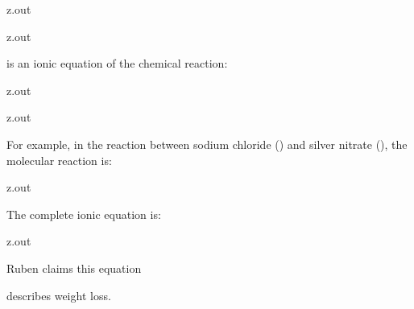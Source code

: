 \MyIO


\begin{VerbatimOut}{z.out}

\end{VerbatimOut}

\MyIO


\begin{VerbatimOut}{z.out}

is an ionic equation of the chemical reaction:
\end{VerbatimOut}

\MyIO


\begin{VerbatimOut}{z.out}

\end{VerbatimOut}

\MyIO


\begin{VerbatimOut}{z.out}


For example, in the reaction between sodium chloride
()
and silver nitrate
(),
the molecular reaction is:

\end{VerbatimOut}

\MyIO


\begin{VerbatimOut}{z.out}

The complete ionic equation is:

\end{VerbatimOut}

\MyIO


\begin{VerbatimOut}{z.out}

Ruben
\cite[starting at 5:25]{meerman2013}
claims this equation
\begin{center}
  \endgraf
\end{center}
describes weight loss.
\end{VerbatimOut}

